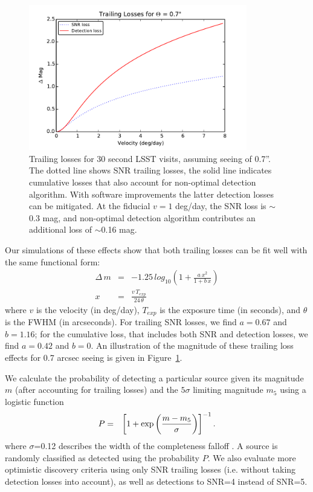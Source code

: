 \begin{figure}[t!]
\centering
\includegraphics[width=0.85\textwidth]{figures/trailing_losses}
\caption{Trailing losses for 30 second LSST visits, assuming seeing of
  0.7''. The dotted line shows SNR trailing losses, the solid line
  indicates cumulative losses that also account for non-optimal detection
  algorithm. With software improvements the latter detection losses can be 
  mitigated. At the fiducial $v=1$ deg/day, the SNR loss is $\sim$0.3 mag,
  and non-optimal detection algorithm contributes an additional loss of 
  $\sim$0.16 mag. 
\label{fig:trailinglosses}}
\end{figure}

Our simulations of these effects show that both trailing losses can be fit well with the 
same functional form:
\begin{eqnarray}
\Delta \, m & = &-1.25 \, log_{10} \left( 1 + \frac{a \, x^2} { 1 + b\,
    x} \right) \\
x & = & \frac{v \, T_{exp}} {24 \, \theta} 
\end{eqnarray}
where $v$ is the velocity (in deg/day), $T_{exp}$ is the exposure time (in seconds), and $\theta$ is the FWHM (in arcseconds). For trailing SNR losses, we find $a = 0.67$ and $b = 1.16$; for the cumulative loss, that includes both SNR and detection losses, 
we find $a=0.42$ and $b=0$. An illustration of the magnitude of these trailing loss effects for 0.7 arcsec seeing is given in Figure~\ref{fig:trailinglosses}. 

We calculate the probability of detecting a particular source given its magnitude $m$ (after accounting for trailing losses)
and the $5\sigma$ limiting magnitude $m_5$ using a logistic function
\begin{eqnarray}
     P & = & \left[ 1 +  {\rm exp}\left(\frac {m -  m_5}{\sigma}\right) \right]^{-1}. 
\end{eqnarray}
where $\sigma$=0.12 describes the width of the completeness falloff \citep{2014ApJ...794..120A}. A source is randomly classified
as detected using the probability $P$. We also evaluate more optimistic discovery criteria using only SNR trailing losses 
(i.e. without taking detection losses into account), as well as detections to SNR=4 instead of SNR=5. 


